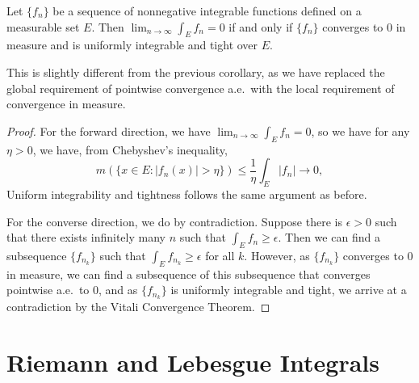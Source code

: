 \documentclass[../main.tex]{subfiles}
\begin{document}
\begin{corollary}{}{}
	Let $\{ f_n \}$ be a sequence of nonnegative integrable functions defined on a measurable set $E$. Then $\lim_{n \to \infty} \int_E f_n = 0$ if and only if $\{ f_n \}$ converges to $0$ in measure and is uniformly integrable and tight over $E$.
\end{corollary}

This is slightly different from the previous corollary, as we have replaced the global requirement of pointwise convergence a.e.\ with the local requirement of convergence in measure.

\begin{proof}
	For the forward direction, we have $\lim_{n \to \infty} \int_E f_n = 0$, so we have for any $\eta > 0$, we have, from Chebyshev's inequality,
	\begin{equation*}
		m(\{ x \in E : |f_n(x)| > \eta \}) \leq \frac{1}{\eta} \int_E |f_n| \to 0,
	\end{equation*}
	Uniform integrability and tightness follows the same argument as before.

	For the converse direction, we do by contradiction. Suppose there is $\epsilon > 0$ such that there exists infinitely many $n$ such that $\int_E f_n \geq \epsilon$. Then we can find a subsequence $\{ f_{n_k} \}$ such that $\int_E f_{n_k} \geq \epsilon$ for all $k$. However, as $\{ f_{n_k} \}$ converges to $0$ in measure, we can find a subsequence of this subsequence that converges pointwise a.e.\ to $0$, and as $\{ f_{n_k} \}$ is uniformly integrable and tight, we arrive at a contradiction by the Vitali Convergence Theorem.
\end{proof}

\section{Riemann and Lebesgue Integrals}
\end{document}
